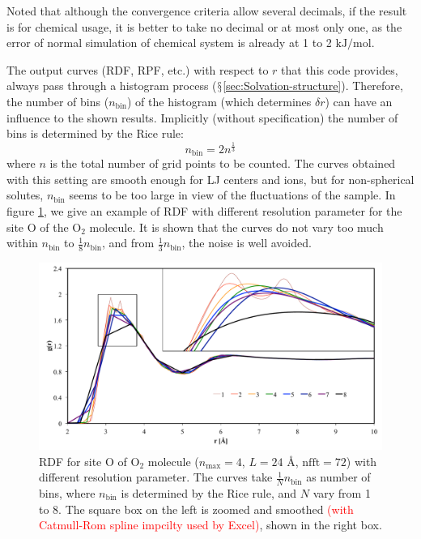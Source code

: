Noted that although the convergence criteria allow several decimals,
if the result is for chemical usage, it is better to take no decimal
or at most only one, as the error of normal simulation of chemical
system is already at 1 to 2 $\mathrm{kJ/mol}$.

The output curves (\acs{RDF}, \acs{RPF}, etc.) with respect to $r$
that this code provides, always pass through a histogram process ($\mathsection$\ref{sec:Solvation-structure}).
Therefore, the number of bins ($n_{\mathrm{bin}}$) of the histogram
(which determines $\delta r$) can have an influence to the shown
results. Implicitly (without specification) the number of bins is
determined by the Rice rule:
\begin{equation}
n_{\mathrm{bin}}=2n^{\frac{1}{3}}
\end{equation}
where $n$ is the total number of grid points to be counted. The curves
obtained with this setting are smooth enough for LJ centers and ions,
but for non-spherical solutes, $n_{\mathrm{bin}}$ seems to be too
large in view of the fluctuations of the sample. In figure \ref{fig:rdf-with-different},
we give an example of \acs{RDF} with different resolution parameter
for the site O of the $\mathrm{O_{2}}$ molecule. It is shown that
the curves do not vary too much within $n_{\mathrm{bin}}$ to $\frac{1}{8}n_{\mathrm{bin}}$,
and from $\frac{1}{3}n_{\mathrm{bin}}$, the noise is well avoided.

\begin{figure}[h]
\begin{centering}
\includegraphics[bb=0cm 0.6cm 33cm 18cm,width=1\columnwidth]{_figure/results/rdf-smoothing}
\par\end{centering}
\caption[\acs{RDF} with different resolution parameter]{\acs{RDF} for site O of $\mathrm{O_{2}}$ molecule ($n_{\max}=4$,
$L=24$ $\textrm{Å}$, $\mathrm{nfft}=72$) with different resolution
parameter. The curves take $\frac{1}{N}n_{\mathrm{bin}}$ as number
of bins, where $n_{\mathrm{bin}}$ is determined by the Rice rule,
and $N$ vary from 1 to 8. The square box on the left is zoomed and
smoothed \textcolor{red}{(with Catmull-Rom spline impcilty used by
Excel)}, shown in the right box.\label{fig:rdf-with-different}}
\end{figure}


